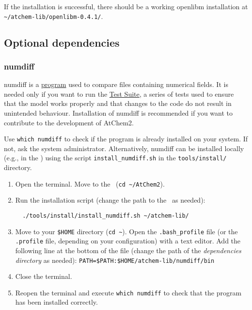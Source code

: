 If the installation is successful, there should be a working openlibm
installation at
\texttt{\textasciitilde{}/atchem-lib/openlibm-0.4.1/}.

\subsection{Optional dependencies} \label{subsec:optional-dependencies}

\subsubsection{numdiff}

numdiff is a \href{https://www.nongnu.org/numdiff/}{program} used to
compare files containing numerical fields. It is needed only if you
want to run the \hyperref[sec:test-suite]{Test Suite}, a series of
tests used to ensure that the model works properly and that changes to
the code do not result in unintended behaviour. Installation of
numdiff is recommended if you want to contribute to the development of
AtChem2.

Use \verb|which numdiff| to check if the program is already installed
on your system. If not, ask the system administrator. Alternatively,
numdiff can be installed locally (e.g., in the \depdir) using the
script \texttt{install\_numdiff.sh} in the \texttt{tools/install/}
directory.

\begin{enumerate}
\item Open the terminal. Move to the \maindir\ (\verb|cd ~/AtChem2|).
\item Run the installation script (change the path to the \depdir\ as
  needed):
  \begin{verbatim}
  ./tools/install/install_numdiff.sh ~/atchem-lib/
  \end{verbatim}
\item Move to your \texttt{\$HOME} directory (\texttt{cd\
    \textasciitilde{}}). Open the \texttt{.bash\_profile} file (or the
  \texttt{.profile} file, depending on your configuration) with a text
  editor. Add the following line at the bottom of the file (change the
  path of the \emph{dependencies directory} as needed):
  \texttt{PATH=\$PATH:\$HOME/atchem-lib/numdiff/bin}
\item Close the terminal.
\item Reopen the terminal and execute \verb|which numdiff| to check
  that the program has been installed correctly.
\end{enumerate}

